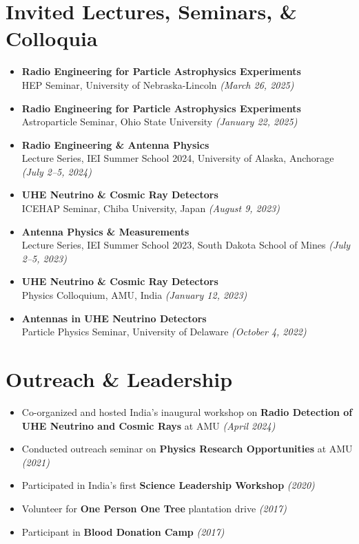 \documentclass[10pt]{report}
\begin{document}
\section*{Invited Lectures, Seminars, \& Colloquia}
\begin{itemize}
    \item \textbf{Radio Engineering for Particle Astrophysics Experiments}\\
    HEP Seminar, University of Nebraska-Lincoln \textit{(March 26, 2025)}
    
    \item \textbf{Radio Engineering for Particle Astrophysics Experiments} \\
    Astroparticle Seminar, Ohio State University \textit{(January 22, 2025)}
    
    \item \textbf{Radio Engineering \& Antenna Physics} \\
    Lecture Series, IEI Summer School 2024, University of Alaska, Anchorage \textit{(July 2--5, 2024)}
    
    \item \textbf{UHE Neutrino \& Cosmic Ray Detectors} \\
    ICEHAP Seminar, Chiba University, Japan \textit{(August 9, 2023)}
    
    \item \textbf{Antenna Physics \& Measurements} \\
    Lecture Series, IEI Summer School 2023, South Dakota School of Mines \textit{(July 2--5, 2023)}
    
    \item \textbf{UHE Neutrino \& Cosmic Ray Detectors} \\
    Physics Colloquium, AMU, India \textit{(January 12, 2023)}
    
    \item \textbf{Antennas in UHE Neutrino Detectors} \\
    Particle Physics Seminar, University of Delaware \textit{(October 4, 2022)}
\end{itemize}

\section*{Outreach \& Leadership}
\begin{itemize}
    \item Co-organized and hosted India's inaugural workshop on \textbf{Radio Detection of UHE Neutrino and Cosmic Rays} at AMU \textit{(April 2024)}
    \item Conducted outreach seminar on \textbf{Physics Research Opportunities} at AMU \textit{(2021)}
    \item Participated in India's first \textbf{Science Leadership Workshop} \textit{(2020)}
    \item Volunteer for \textbf{One Person One Tree} plantation drive \textit{(2017)}
    \item Participant in \textbf{Blood Donation Camp} \textit{(2017)}
\end{itemize}
\end{document}
